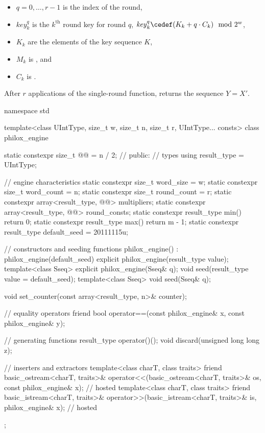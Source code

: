 \begin{itemize}
\begin{itemize}
  \item
  $q = 0, \dotsc, r - 1$ is the index of the round,

  \item
  $\mathit{key}^q_k$ is the $k^\text{th}$ round key for round $q$,
  $\mathit{key}^q_k \cedef (K_k + q \cdot C_k) \mod 2^w$,

  \item
  $K_k$ are the elements of the key sequence $K$,

  \item
  $M_k$ is , and

  \item
  $C_k$ is .
  \end{itemize}
\end{itemize}

\pnum
After $r$ applications of the single-round function,
 returns the sequence $Y = X'$.

%
%
\begin{codeblock}
namespace std {
  template<class UIntType, size_t w, size_t n, size_t r, UIntType... consts>
  class philox_engine {
    static constexpr size_t @@ = n / 2;   // \expos
  public:
    // types
    using result_type = UIntType;

    // engine characteristics
    static constexpr size_t word_size = w;
    static constexpr size_t word_count = n;
    static constexpr size_t round_count = r;
    static constexpr array<result_type, @@> multipliers;
    static constexpr array<result_type, @@> round_consts;
    static constexpr result_type min() { return 0; }
    static constexpr result_type max() { return m - 1; }
    static constexpr result_type default_seed = 20111115u;

    // constructors and seeding functions
    philox_engine() : philox_engine(default_seed) {}
    explicit philox_engine(result_type value);
    template<class Sseq> explicit philox_engine(Sseq& q);
    void seed(result_type value = default_seed);
    template<class Sseq> void seed(Sseq& q);

    void set_counter(const array<result_type, n>& counter);

    // equality operators
    friend bool operator==(const philox_engine& x, const philox_engine& y);

    // generating functions
    result_type operator()();
    void discard(unsigned long long z);

    // inserters and extractors
    template<class charT, class traits>
      friend basic_ostream<charT, traits>&
        operator<<(basic_ostream<charT, traits>& os, const philox_engine& x);   // hosted
    template<class charT, class traits>
      friend basic_istream<charT, traits>&
        operator>>(basic_istream<charT, traits>& is, philox_engine& x);         // hosted
  };
}
\end{codeblock}

